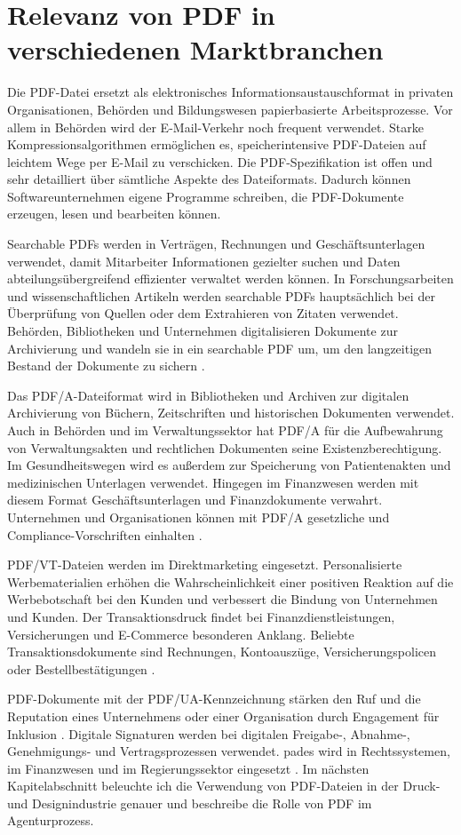 \section{Relevanz von PDF in verschiedenen Marktbranchen}
Die PDF-Datei ersetzt als elektronisches Informationsaustauschformat in privaten Organisationen, Behörden und Bildungswesen papierbasierte Arbeitsprozesse. Vor allem in Behörden wird der E-Mail-Verkehr noch frequent verwendet. Starke Kompressionsalgorithmen ermöglichen es, speicherintensive PDF-Dateien auf leichtem Wege per E-Mail zu verschicken. Die PDF-Spezifikation ist offen und sehr detailliert über sämtliche Aspekte des Dateiformats. Dadurch können Softwareunternehmen eigene Programme schreiben, die PDF-Dokumente erzeugen, lesen und bearbeiten können. 
\par
Searchable PDFs werden in Verträgen, Rechnungen und Geschäftsunterlagen verwendet, damit Mitarbeiter Informationen gezielter suchen und Daten abteilungsübergreifend effizienter verwaltet werden können. In Forschungsarbeiten und wissenschaftlichen Artikeln werden searchable PDFs hauptsächlich bei der Überprüfung von Quellen oder dem Extrahieren von Zitaten verwendet. Behörden, Bibliotheken und Unternehmen digitalisieren Dokumente zur Archivierung und wandeln sie in ein searchable PDF um, um den langzeitigen Bestand der Dokumente zu sichern \cite{adobe-search}.
\par
Das PDF/A-Dateiformat wird in Bibliotheken und Archiven zur digitalen Archivierung von Büchern, Zeitschriften und historischen Dokumenten verwendet. Auch in Behörden und im Verwaltungssektor hat PDF/A für die Aufbewahrung von Verwaltungsakten und rechtlichen Dokumenten seine Existenzberechtigung. Im Gesundheitswegen wird es außerdem zur Speicherung von Patientenakten und medizinischen Unterlagen verwendet. Hingegen im Finanzwesen werden mit diesem Format Geschäftsunterlagen und Finanzdokumente verwahrt. Unternehmen und Organisationen können mit PDF/A gesetzliche und Compliance-Vorschriften einhalten \cite{adobe-pdf-a}. 
\par
PDF/VT-Dateien werden im Direktmarketing eingesetzt. Personalisierte Werbematerialien erhöhen die Wahrscheinlichkeit einer positiven Reaktion auf die Werbebotschaft bei den Kunden und verbessert die Bindung von Unternehmen und Kunden. Der Transaktionsdruck findet bei Finanzdienstleistungen, Versicherungen und E-Commerce besonderen Anklang. Beliebte Transaktionsdokumente sind Rechnungen, Kontoauszüge, Versicherungspolicen oder Bestellbestätigungen \cite{adobe-pdf-vt}. 
\par
PDF-Dokumente mit der PDF/UA-Kennzeichnung stärken den Ruf und die Reputation eines Unternehmens oder einer Organisation durch Engagement für Inklusion \cite{adobe-pdf-ua}. Digitale Signaturen werden bei digitalen Freigabe-, Abnahme-, Genehmigungs- und Vertragsprozessen verwendet. \gls{pades} wird in Rechtssystemen, im Finanzwesen und im Regierungssektor eingesetzt \cite{adobe-pdf-pades}. Im nächsten Kapitelabschnitt beleuchte ich die Verwendung von PDF-Dateien in der Druck- und Designindustrie genauer und beschreibe die Rolle von PDF im Agenturprozess.  